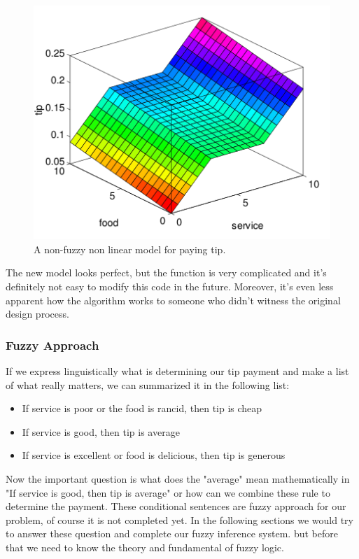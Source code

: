 \documentclass{article}
\begin{document}
\begin{figure}[H]
\begin{center}
\includegraphics[scale=0.3]{./images/non-fuzzy_non_linear_tip.png}
\caption{A non-fuzzy non linear model for paying tip.}
\label{non-fuzzy_linear_tip}
\end{center}
\end{figure}

The new model looks perfect, but the function is very complicated and it's definitely not easy to modify this
code in the future. Moreover, it's even less apparent how the algorithm works
to someone who didn't witness the original design process.


\subsubsection{Fuzzy Approach}
If we express linguistically what is determining our tip payment and make a list of what really matters, we can summarized it in the following list:
\begin{itemize}
\item If service is poor or the food is rancid, then tip is cheap
\item If service is good, then tip is average
\item If service is excellent or food is delicious, then tip is generous
\end{itemize}
Now the important question is what does the "average" mean mathematically in "If service is good, then tip is average" or how can we combine these rule to determine the payment.
These conditional sentences are fuzzy approach for our problem, of course it is not completed yet.
In the following sections we would try to answer these question and complete our fuzzy inference system. 
but before that we need to know the theory and fundamental of fuzzy logic.
\end{document}
